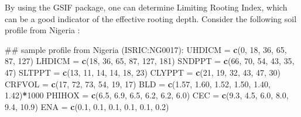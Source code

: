 \documentclass[graybox,natbib,nospthms,UStrade]{svmono}
\newenvironment{Shaded}{\begin{snugshade}}{\end{snugshade}}
\newcommand{\DecValTok}[1]{\textcolor[rgb]{0.06,0.06,0.06}{#1}}
\newcommand{\FloatTok}[1]{\textcolor[rgb]{0.06,0.06,0.06}{#1}}
\newcommand{\KeywordTok}[1]{\textcolor[rgb]{0.27,0.27,0.27}{\textbf{#1}}}
\newcommand{\NormalTok}[1]{#1}
\newcommand{\OperatorTok}[1]{\textcolor[rgb]{0.43,0.43,0.43}{\textbf{#1}}}
\newcommand{\StringTok}[1]{\textcolor[rgb]{0.5,0.5,0.5}{#1}}
\begin{document}
By using the GSIF package, one can determine Limiting Rooting Index, which
can be a good indicator of the effective rooting depth. Consider the
following soil profile from Nigeria \citep{Leenaars2012}:

\begin{Shaded}
\begin{Highlighting}[]
\NormalTok{## sample profile from Nigeria (ISRIC:NG0017):}
\NormalTok{UHDICM =}\StringTok{ }\KeywordTok{c}\NormalTok{(}\DecValTok{0}\NormalTok{, }\DecValTok{18}\NormalTok{, }\DecValTok{36}\NormalTok{, }\DecValTok{65}\NormalTok{, }\DecValTok{87}\NormalTok{, }\DecValTok{127}\NormalTok{)}
\NormalTok{LHDICM =}\StringTok{ }\KeywordTok{c}\NormalTok{(}\DecValTok{18}\NormalTok{, }\DecValTok{36}\NormalTok{, }\DecValTok{65}\NormalTok{, }\DecValTok{87}\NormalTok{, }\DecValTok{127}\NormalTok{, }\DecValTok{181}\NormalTok{)}
\NormalTok{SNDPPT =}\StringTok{ }\KeywordTok{c}\NormalTok{(}\DecValTok{66}\NormalTok{, }\DecValTok{70}\NormalTok{, }\DecValTok{54}\NormalTok{, }\DecValTok{43}\NormalTok{, }\DecValTok{35}\NormalTok{, }\DecValTok{47}\NormalTok{)}
\NormalTok{SLTPPT =}\StringTok{ }\KeywordTok{c}\NormalTok{(}\DecValTok{13}\NormalTok{, }\DecValTok{11}\NormalTok{, }\DecValTok{14}\NormalTok{, }\DecValTok{14}\NormalTok{, }\DecValTok{18}\NormalTok{, }\DecValTok{23}\NormalTok{)}
\NormalTok{CLYPPT =}\StringTok{ }\KeywordTok{c}\NormalTok{(}\DecValTok{21}\NormalTok{, }\DecValTok{19}\NormalTok{, }\DecValTok{32}\NormalTok{, }\DecValTok{43}\NormalTok{, }\DecValTok{47}\NormalTok{, }\DecValTok{30}\NormalTok{)}
\NormalTok{CRFVOL =}\StringTok{ }\KeywordTok{c}\NormalTok{(}\DecValTok{17}\NormalTok{, }\DecValTok{72}\NormalTok{, }\DecValTok{73}\NormalTok{, }\DecValTok{54}\NormalTok{, }\DecValTok{19}\NormalTok{, }\DecValTok{17}\NormalTok{)}
\NormalTok{BLD =}\StringTok{ }\KeywordTok{c}\NormalTok{(}\FloatTok{1.57}\NormalTok{, }\FloatTok{1.60}\NormalTok{, }\FloatTok{1.52}\NormalTok{, }\FloatTok{1.50}\NormalTok{, }\FloatTok{1.40}\NormalTok{, }\FloatTok{1.42}\NormalTok{)}\OperatorTok{*}\DecValTok{1000}
\NormalTok{PHIHOX =}\StringTok{ }\KeywordTok{c}\NormalTok{(}\FloatTok{6.5}\NormalTok{, }\FloatTok{6.9}\NormalTok{, }\FloatTok{6.5}\NormalTok{, }\FloatTok{6.2}\NormalTok{, }\FloatTok{6.2}\NormalTok{, }\FloatTok{6.0}\NormalTok{)}
\NormalTok{CEC =}\StringTok{ }\KeywordTok{c}\NormalTok{(}\FloatTok{9.3}\NormalTok{, }\FloatTok{4.5}\NormalTok{, }\FloatTok{6.0}\NormalTok{, }\FloatTok{8.0}\NormalTok{, }\FloatTok{9.4}\NormalTok{, }\FloatTok{10.9}\NormalTok{)}
\NormalTok{ENA =}\StringTok{ }\KeywordTok{c}\NormalTok{(}\FloatTok{0.1}\NormalTok{, }\FloatTok{0.1}\NormalTok{, }\FloatTok{0.1}\NormalTok{, }\FloatTok{0.1}\NormalTok{, }\FloatTok{0.1}\NormalTok{, }\FloatTok{0.2}\NormalTok{)}

\end{Highlighting}
\end{Shaded}
\end{document}

